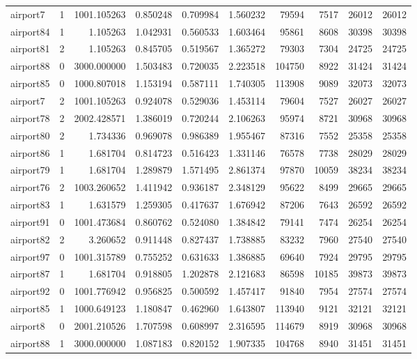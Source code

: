 \begin{longtable}{|l|r|r|r|r|r|r|r|r|r|}
airport7 & 1 & 1001.105263 & 0.850248 & 0.709984 & 1.560232 & 79594 & 7517 & 26012 & 26012 \\
airport84 & 1 & 1.105263 & 1.042931 & 0.560533 & 1.603464 & 95861 & 8608 & 30398 & 30398 \\
airport81 & 2 & 1.105263 & 0.845705 & 0.519567 & 1.365272 & 79303 & 7304 & 24725 & 24725 \\
airport88 & 0 & 3000.000000 & 1.503483 & 0.720035 & 2.223518 & 104750 & 8922 & 31424 & 31424 \\
airport85 & 0 & 1000.807018 & 1.153194 & 0.587111 & 1.740305 & 113908 & 9089 & 32073 & 32073 \\
airport7 & 2 & 1001.105263 & 0.924078 & 0.529036 & 1.453114 & 79604 & 7527 & 26027 & 26027 \\
airport78 & 2 & 2002.428571 & 1.386019 & 0.720244 & 2.106263 & 95974 & 8721 & 30968 & 30968 \\
airport80 & 2 & 1.734336 & 0.969078 & 0.986389 & 1.955467 & 87316 & 7552 & 25358 & 25358 \\
airport86 & 1 & 1.681704 & 0.814723 & 0.516423 & 1.331146 & 76578 & 7738 & 28029 & 28029 \\
airport79 & 1 & 1.681704 & 1.289879 & 1.571495 & 2.861374 & 97870 & 10059 & 38234 & 38234 \\
airport76 & 2 & 1003.260652 & 1.411942 & 0.936187 & 2.348129 & 95622 & 8499 & 29665 & 29665 \\
airport83 & 1 & 1.631579 & 1.259305 & 0.417637 & 1.676942 & 87206 & 7643 & 26592 & 26592 \\
airport91 & 0 & 1001.473684 & 0.860762 & 0.524080 & 1.384842 & 79141 & 7474 & 26254 & 26254 \\
airport82 & 2 & 3.260652 & 0.911448 & 0.827437 & 1.738885 & 83232 & 7960 & 27540 & 27540 \\
airport97 & 0 & 1001.315789 & 0.755252 & 0.631633 & 1.386885 & 69640 & 7924 & 29795 & 29795 \\
airport87 & 1 & 1.681704 & 0.918805 & 1.202878 & 2.121683 & 86598 & 10185 & 39873 & 39873 \\
airport92 & 0 & 1001.776942 & 0.956825 & 0.500592 & 1.457417 & 91840 & 7954 & 27574 & 27574 \\
airport85 & 1 & 1000.649123 & 1.180847 & 0.462960 & 1.643807 & 113940 & 9121 & 32121 & 32121 \\
airport8 & 0 & 2001.210526 & 1.707598 & 0.608997 & 2.316595 & 114679 & 8919 & 30968 & 30968 \\
airport88 & 1 & 3000.000000 & 1.087183 & 0.820152 & 1.907335 & 104768 & 8940 & 31451 & 31451 \\

\end{longtable}
